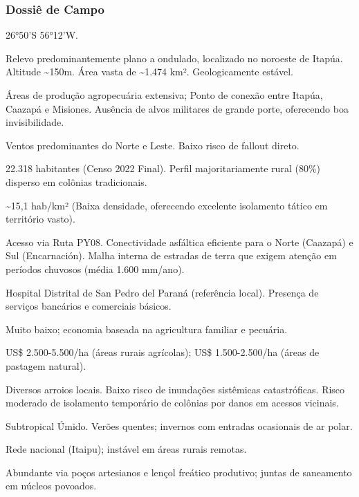 \subsubsection{Dossiê de Campo}
\begin{description}[style=nextline,leftmargin=0.5cm,font=\bfseries]
\item[Coordenadas]  26°50'S 56°12'W.
\item[Topografia]  Relevo predominantemente plano a ondulado, localizado no noroeste de Itapúa. Altitude \textasciitilde 150m. Área vasta de \textasciitilde 1.474 km². Geologicamente estável.
\item[Alvos Estratégicos]  Áreas de produção agropecuária extensiva; Ponto de conexão entre Itapúa, Caazapá e Misiones. Ausência de alvos militares de grande porte, oferecendo boa invisibilidade.
\item[Fallout]  Ventos predominantes do Norte e Leste. Baixo risco de fallout direto.
\item[População]  22.318 habitantes (Censo 2022 Final). Perfil majoritariamente rural (80\%) disperso em colônias tradicionais.
\item[Densidade]  \textasciitilde 15,1 hab/\allowbreak km² (Baixa densidade, oferecendo excelente isolamento tático em território vasto).
\item[Vias de Acesso]  Acesso via Ruta PY08. Conectividade asfáltica eficiente para o Norte (Caazapá) e Sul (Encarnación). Malha interna de estradas de terra que exigem atenção em períodos chuvosos (média 1.600 mm/\allowbreak ano).
\item[Serviços]  Hospital Distrital de San Pedro del Paraná (referência local). Presença de serviços bancários e comerciais básicos.
\item[Custo de Vida]  Muito baixo; economia baseada na agricultura familiar e pecuária.
\item[Preço da Terra]  US\$ 2.500-5.500/\allowbreak ha (áreas rurais agrícolas); US\$ 1.500-2.500/\allowbreak ha (áreas de pastagem natural).
\item[Hidrologia]  Diversos arroios locais. Baixo risco de inundações sistêmicas catastróficas. Risco moderado de isolamento temporário de colônias por danos em acessos vicinais.
\item[Clima]  Subtropical Úmido. Verões quentes; invernos com entradas ocasionais de ar polar.
\item[Energia]  Rede nacional (Itaipu); instável em áreas rurais remotas.
\item[Água]  Abundante via poços artesianos e lençol freático produtivo; juntas de saneamento em núcleos povoados.

\end{description}
